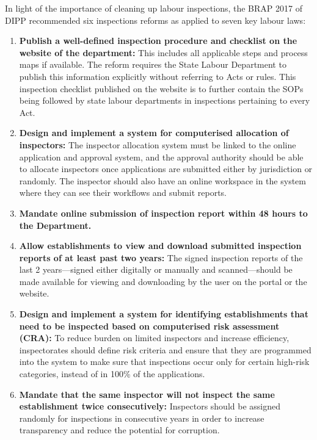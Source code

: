 \documentclass[a4paper, 12pt, twoside]{article}
\begin{document}
In light of the importance of cleaning up labour inspections, the BRAP 2017 of DIPP recommended six inspections reforms as applied to seven key labour laws: 
\begin{enumerate}
\item \textbf{Publish a well-defined inspection procedure and checklist on the website of the department:} This includes all applicable steps and process maps if available. The reform requires the State Labour Department to publish this information explicitly without referring to Acts or rules. This inspection checklist published on the website is to further contain the SOPs being followed by state labour departments in inspections pertaining to every Act. 
\item \textbf{Design and implement a system for computerised allocation of inspectors:} The inspector allocation system must be linked to the online application and approval system, and the approval authority should be able to allocate inspectors once applications are submitted either by jurisdiction or randomly. The inspector should also have an online workspace in the system where they can see their workflows and submit reports.
\item \textbf{Mandate online submission of inspection report within 48 hours to the Department.}
\item \textbf{Allow establishments to view and download submitted inspection reports of at least past two years:} The signed inspection reports of the last 2 years—signed either digitally or manually and scanned—should be made available for viewing and downloading by the user on the portal or the website. 
\item \textbf{Design and implement a system for identifying establishments that need to be inspected based on computerised risk assessment (CRA):} To reduce burden on limited inspectors and increase efficiency, inspectorates should define risk criteria and ensure that they are programmed into the system to make sure that inspections occur only for certain high-risk categories, instead of in 100\% of the applications.
\item \textbf{Mandate that the same inspector will not inspect the same establishment twice consecutively:} Inspectors should be assigned randomly for inspections in consecutive years in order to increase transparency and reduce the potential for corruption.
\end{enumerate}

\end{document}
